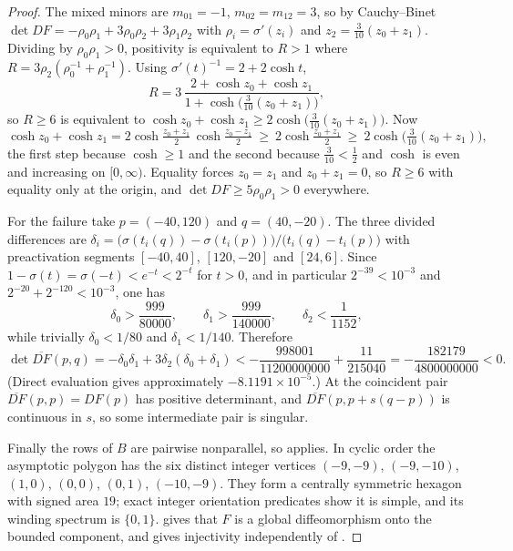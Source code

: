 \documentclass[11pt,twoside,leqno]{article}
\theoremstyle{plain}
\theoremstyle{definition}
\theoremstyle{remark}
\begin{document}
\begin{proof}
The mixed minors are $m_{01}=-1$, $m_{02}=m_{12}=3$, so by Cauchy--Binet
$\det DF=-\rho_0\rho_1+3\rho_0\rho_2+3\rho_1\rho_2$ with
$\rho_i=\sigma'(z_i)$ and $z_2=\tfrac3{10}(z_0+z_1)$.  Dividing by
$\rho_0\rho_1>0$, positivity is equivalent to $R>1$ where
$R=3\rho_2(\rho_0^{-1}+\rho_1^{-1})$.  Using
$\sigma'(t)^{-1}=2+2\cosh t$,
\[
 R=3\,\frac{2+\cosh z_0+\cosh z_1}{1+\cosh\bigl(\tfrac3{10}(z_0+z_1)\bigr)} ,
\]
so $R\ge6$ is equivalent to
$\cosh z_0+\cosh z_1\ge 2\cosh\bigl(\tfrac3{10}(z_0+z_1)\bigr)$.  Now
\[
 \cosh z_0+\cosh z_1
 =2\cosh\tfrac{z_0+z_1}{2}\,\cosh\tfrac{z_0-z_1}{2}
 \ \ge\ 2\cosh\tfrac{z_0+z_1}{2}
 \ \ge\ 2\cosh\bigl(\tfrac3{10}(z_0+z_1)\bigr),
\]
the first step because $\cosh\ge1$ and the second because
$\tfrac3{10}<\tfrac12$ and $\cosh$ is even and increasing on $[0,\infty)$.
Equality forces $z_0=z_1$ and $z_0+z_1=0$, so $R\ge6$ with equality only at
the origin, and $\det DF\ge5\rho_0\rho_1>0$ everywhere.

For the failure take $p=(-40,120)$ and $q=(40,-20)$.  The three divided
differences are
$\delta_i=\bigl(\sigma(t_i(q))-\sigma(t_i(p))\bigr)/\bigl(t_i(q)-t_i(p)\bigr)$
with preactivation segments $[-40,40]$, $[120,-20]$ and $[24,6]$.  Since
$1-\sigma(t)=\sigma(-t)<e^{-t}<2^{-t}$ for $t>0$, and in particular
$2^{-39}<10^{-3}$ and $2^{-20}+2^{-120}<10^{-3}$, one has
\[
 \delta_0>\frac{999}{80000},\qquad
  \delta_1>\frac{999}{140000},\qquad
  \delta_2<\frac1{1152},
 \]
while trivially $\delta_0<1/80$ and $\delta_1<1/140$.  Therefore
\[
\det\overline{DF}(p,q)
 =-\delta_0\delta_1+3\delta_2(\delta_0+\delta_1)
 <-\frac{998001}{11200000000}+\frac{11}{215040}
 =-\frac{182179}{4800000000}<0.
 \]
(Direct evaluation gives approximately $-8.1191\times10^{-5}$.)  At the
coincident pair $\overline{DF}(p,p)=DF(p)$ has positive determinant, and
$\overline{DF}(p,p+s(q-p))$ is continuous in $s$, so some intermediate pair is
singular.

Finally the rows of $B$ are pairwise nonparallel, so 
applies.  In cyclic order the asymptotic polygon has the six distinct integer
vertices $(-9,-9)$, $(-9,-10)$, $(1,0)$, $(0,0)$, $(0,1)$, $(-10,-9)$.
They form a centrally symmetric hexagon with signed area $19$; exact integer
orientation predicates show it is simple, and its winding spectrum is
$\{0,1\}$.   gives that $F$ is a global diffeomorphism onto the
bounded component, and  gives injectivity independently of
.
\end{proof}
\end{document}
